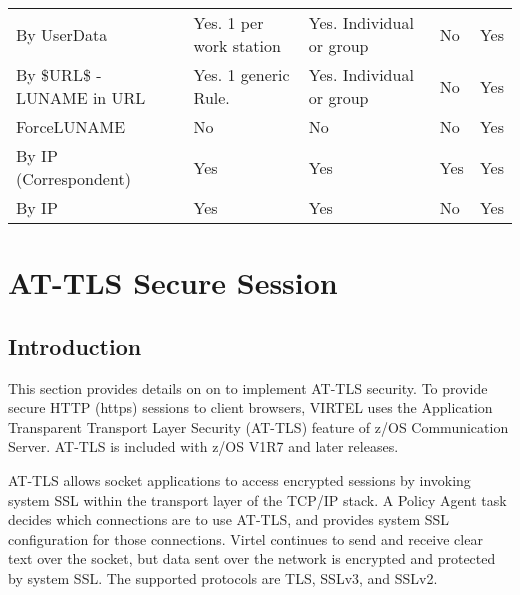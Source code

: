 \documentclass[letterpaper,10pt,english]{sphinxmanual}
\begin{document}
\begin{savenotes}\sphinxattablestart
\centering
\begin{tabulary}{\linewidth}[t]{|T|T|T|T|T|}
\hline
{}\relax &\relax &\relax &\relax &\relax \\
\hline
By UserData
&
Yes. 1 per work station
&
Yes. Individual or group
&
No
&
Yes
\\
\hline
By \$URL\$ - LUNAME in URL
&
Yes. 1 generic Rule.
&
Yes. Individual or group
&
No
&
Yes
\\
\hline
ForceLUNAME
&
No
&
No
&
No
&
Yes
\\
\hline
By IP (Correspondent)
&
Yes
&
Yes
&
Yes
&
Yes
\\
\hline
By IP
&
Yes
&
Yes
&
No
&
Yes
\\
\hline
\end{tabulary}
\par
\sphinxattableend\end{savenotes}


\chapter{AT-TLS Secure Session}
\label{\detokenize{connectivity_guide:at-tls-secure-session}}\label{\detokenize{connectivity_guide:index-156}}

\section{Introduction}
\label{\detokenize{connectivity_guide:id73}}
This section provides details on on to implement AT-TLS security. To provide secure HTTP (https) sessions to client browsers, VIRTEL uses the Application Transparent Transport Layer Security (AT-TLS) feature of z/OS Communication Server. AT-TLS is included with z/OS V1R7 and later releases.

AT-TLS allows socket applications to access encrypted sessions by invoking system SSL within the transport layer of the TCP/IP stack. A Policy Agent task decides which connections are to use AT-TLS, and provides system SSL configuration for those connections. Virtel continues to send and receive clear text over the socket, but data sent over the network is encrypted and protected by system SSL. The supported protocols are TLS, SSLv3, and SSLv2.
\end{document}

